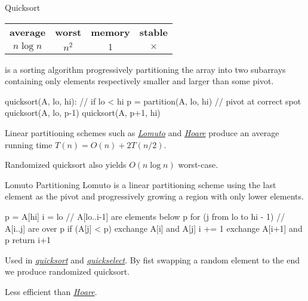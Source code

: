 \documentclass{cognito}
\begin{document}

\begin{note}{Quicksort}
	\begin{mdframed}[linecolor=black!25!white]%
	\begin{tabular}{@{} c | c | c | c  @{}}
		\bf average & \bf worst & \bf memory & \bf stable \\
		$n \log n$ & $n^2$ & $1$ & $\times$
	\end{tabular}%
	\end{mdframed}
	 is a sorting algorithm progressively partitioning the array
	into two subarrays containing only elements respectively smaller and larger than
	some pivot.
	\begin{largecode}
 quicksort(A, lo, hi):        // if lo < hi
 	p = partition(A, lo, hi)  // pivot at correct spot
	quicksort(A, lo, p-1)
	quicksort(A, p+1, hi)
	\end{largecode}	
	Linear partitioning schemes such as \hyperref[note:Lomuto Partitioning]{\it Lomuto} and \hyperref[note:Hoare Partitioning]{\it Hoare}
	produce an average running time $T(n) = O(n) + 2 T(n/2)$.
	\begin{remark} Randomized quicksort also yields $O(n \log n)$ worst-case. \end{remark}
	\vspace{-5pt}
\end{note}


\begin{note}{Lomuto Partitioning}
	Lomuto is a linear partitioning scheme using the last element as the pivot
	and progressively growing a region with only lower elements.
	\begin{largecode}
 p = A[hi]
 i = lo  // A[lo..i-1] are elements below p
 for (j from lo to hi - 1)  // A[i..j] are over p
 	if (A[j] < p)
		exchange A[i] and A[j]
		i += 1
exchange A[i+1] and p
return i+1
	\end{largecode}
	\begin{remark} Used in \hyperref[note:Quicksort]{\it quicksort} and \hyperref[note:Quickselect]{\it quickselect}.
		By fist swapping a random element to the end we produce randomized quicksort.
	\end{remark}
	\begin{remark} Less efficient than \hyperref[note:Hoare Partitioning]{\it Hoare}.
	\end{remark}
	\vspace{-5pt}
\end{note}
\end{document}
